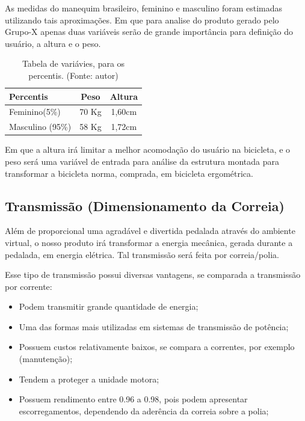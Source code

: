 As medidas do manequim brasileiro, feminino e masculino foram estimadas utilizando tais aproximações. Em que para analise do produto gerado pelo Grupo-X apenas duas variáveis serão de grande importância para definição do usuário, a altura e o peso.

\begin{table}[h]
  \centering
  \begin{tabular}{|p{3cm}|c|c|}
    \hline
    Percentis                                                  & Peso  & Altura \\ \hline
  Feminino(5\%) & 70 Kg & 1,60cm \\ \hline
  Masculino (95\%) & 58 Kg & 1,72cm \\ \hline
  \end{tabular}
  \caption{Tabela de variávies, para os percentis. (Fonte: autor)}
\end{table}

Em que a altura irá limitar a melhor acomodação do usuário na bicicleta, e o peso será uma variável de entrada para análise da estrutura montada para transformar a bicicleta norma, comprada, em bicicleta ergométrica.

\subsection{Transmissão (Dimensionamento da Correia)}

Além de proporcional uma agradável e divertida pedalada através do ambiente virtual, o nosso produto irá transformar a energia mecânica, gerada durante a pedalada, em energia elétrica. Tal transmissão será feita por correia/polia.

Esse tipo de transmissão possui diversas vantagens, se comparada a transmissão por corrente:

\begin{itemize}
  \item Podem transmitir grande quantidade de energia;
  \item Uma das formas mais utilizadas em sistemas de transmissão de potência;
  \item Possuem custos relativamente baixos, se compara a correntes, por exemplo (manutenção);
  \item Tendem a proteger a unidade motora;
  \item Possuem rendimento entre 0.96 a 0.98, pois podem apresentar escorregamentos, dependendo da aderência da correia sobre a polia;
\end{itemize}

